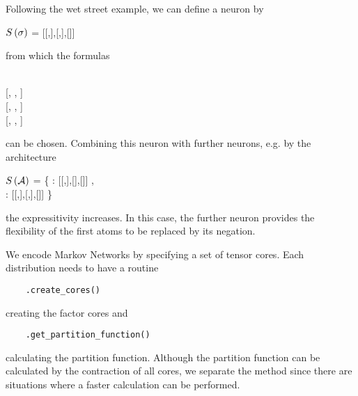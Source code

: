 \begin{example}
    Following the wet street example, we can define a neuron by
    \begin{centeredcode}
        $S\left(\sigma\right)$ = [[,],[,],[]]
    \end{centeredcode}
    from which the formulas
    \begin{centeredcode}
         \\
		\hspace{0.25cm} [, , ] \\
		\hspace{1cm}[, , ] \\
		\hspace{1cm}[, , ]
    \end{centeredcode}
    can be chosen.
    Combining this neuron with further neurons, e.g. by the architecture
    \begin{centeredcode}
        $S\left(\mathcal{A}\right)$ = \{ : [[,],[],[]] , \\
		\hspace{1.8cm}: [[,],[,],[]] \}
    \end{centeredcode}
    the expressitivity increases.
    In this case, the further neuron provides the flexibility of the first atoms to be replaced by its negation.
\end{example}




We encode Markov Networks by specifying a set of tensor cores.
Each distribution needs to have a routine
\begin{lstlisting}
	.create_cores()
\end{lstlisting}
creating the factor cores and
\begin{lstlisting}
	.get_partition_function()
\end{lstlisting}
calculating the partition function.
Although the partition function can be calculated by the contraction of all cores, we separate the method since there are situations where a faster calculation can be performed.


